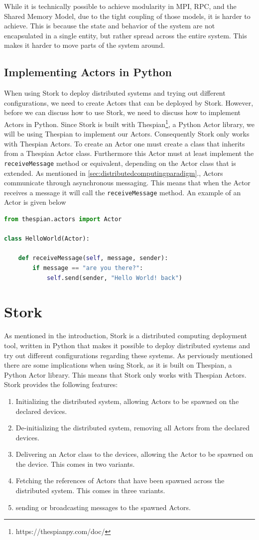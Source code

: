 \documentclass[a4paper]{article}
\newcommand{\secref}[1]{\autoref{#1}.}
\begin{document}
While it is technically possible to achieve modularity in MPI, RPC, and the Shared Memory Model, due to the tight coupling of those models, it is harder to achieve. This is because the state and behavior of the system are not encapsulated in a single entity, but rather spread across the entire system. This makes it harder to move parts of the system around.
\subsection{Implementing Actors in Python}
When using Stork to deploy distributed systems and trying out different configurations, we need to create Actors that can be deployed by Stork. However, before we can discuss how to use Stork, we need to discuss how to implement Actors in Python. Since Stork is built with Thespian\footnote{https://thespianpy.com/doc/}, a Python Actor library, we will be using Thespian to implement our Actors. Consequently Stork only works with Thespian Actors. To create an Actor one must create a class that inherits from a Thespian Actor class. Furthermore this Actor must at least implement the \lstinline{receiveMessage} method or equivalent, depending on the Actor class that is extended. As mentioned in \secref{sec:distributedcomputingparadigm}, Actors communicate through asynchronous messaging. This means that when the Actor receives a message it will call the \lstinline{receiveMessage} method. An example of an Actor is given below
\begin{lstlisting}[language=Python, caption=Actor example, label=lst:actor]
from thespian.actors import Actor

class HelloWorld(Actor):

    def receiveMessage(self, message, sender):
        if message == "are you there?":
            self.send(sender, "Hello World! back")
\end{lstlisting}
\section{Stork}
As mentioned in the introduction, Stork is a distributed computing deployment tool, written in Python that makes it possible to deploy distributed systems and try out different configurations regarding these systems. As perviously mentioned there are some implications when using Stork, as it is built on Thespian, a Python Actor library. This means that Stork only works with Thespian Actors. Stork provides the following features:
\begin{enumerate}
    \item Initializing the distributed system, allowing Actors to be spawned on the declared devices.
    \item De-initializing the distributed system, removing all Actors from the declared devices.
    \item Delivering an Actor class to the devices, allowing the Actor to be spawned on the device. This comes in two variants.
    \item Fetching the references of Actors that have been spawned across the distributed system. This comes in three variants.
    \item sending or broadcasting messages to the spawned Actors.
\end{enumerate}
\end{document}
